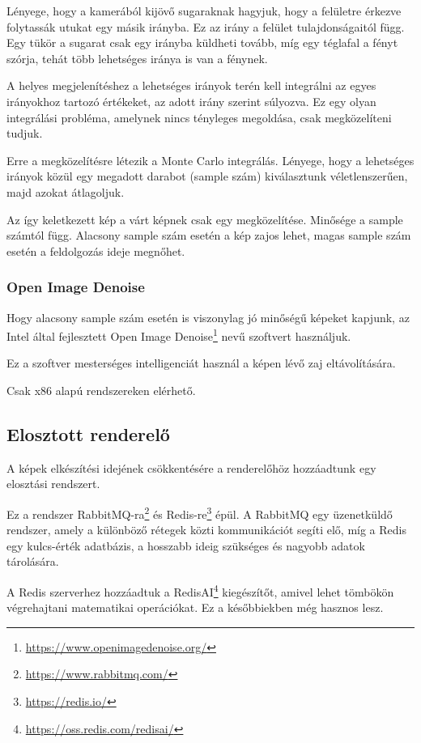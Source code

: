 Lényege, hogy a kamerából kijövő sugaraknak hagyjuk, hogy a felületre érkezve folytassák utukat egy másik irányba. Ez az irány a felület tulajdonságaitól függ. Egy tükör a sugarat csak egy irányba küldheti tovább, míg egy téglafal a fényt szórja, tehát több lehetséges iránya is van a fénynek. 

A helyes megjelenítéshez a lehetséges irányok terén kell integrálni az egyes irányokhoz tartozó értékeket, az adott irány szerint súlyozva. Ez egy olyan integrálási probléma, amelynek nincs tényleges megoldása, csak megközelíteni tudjuk.

Erre a megközelítésre létezik a Monte Carlo integrálás. Lényege, hogy a lehetséges irányok közül egy megadott darabot (sample szám) kiválasztunk véletlenszerűen, majd azokat átlagoljuk.

Az így keletkezett kép a várt képnek csak egy megközelítése. Minősége a sample számtól függ. Alacsony sample szám esetén a kép zajos lehet, magas sample szám esetén a feldolgozás ideje megnőhet.

\subsubsection{Open Image Denoise}
Hogy alacsony sample szám esetén is viszonylag jó minőségű képeket kapjunk, az Intel által fejlesztett Open Image Denoise\footnote{\url{https://www.openimagedenoise.org/}} nevű szoftvert használjuk. 

Ez a szoftver mesterséges intelligenciát használ a képen lévő zaj eltávolítására.

Csak x86 alapú rendszereken elérhető.


\subsection{Elosztott renderelő}

A képek elkészítési idejének csökkentésére a renderelőhöz hozzáadtunk egy elosztási rendszert.

Ez a rendszer RabbitMQ-ra\footnote{\url{https://www.rabbitmq.com/}} és Redis-re\footnote{\url{https://redis.io/}} épül. A RabbitMQ egy üzenetküldő rendszer, amely a különböző rétegek közti kommunikációt segíti elő, míg a Redis egy kulcs-érték adatbázis, a hosszabb ideig szükséges és nagyobb adatok tárolására.

A Redis szerverhez hozzáadtuk a RedisAI\footnote{\url{https://oss.redis.com/redisai/}} kiegészítőt, amivel lehet tömbökön végrehajtani matematikai operációkat. Ez a későbbiekben még hasznos lesz.

